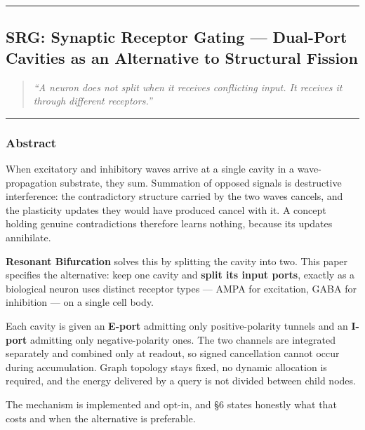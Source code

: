 \documentclass[
  11pt,
  a4paper,
]{article}
\begin{document}
\begin{center}\rule{0.5\linewidth}{0.5pt}\end{center}

\newpage

\subsection{SRG: Synaptic Receptor Gating --- Dual-Port Cavities as an
Alternative to Structural
Fission}\label{srg-synaptic-receptor-gating-dual-port-cavities-as-an-alternative-to-structural-fission}

\begin{quote}
\emph{``A neuron does not split when it receives conflicting input. It
receives it through different receptors.''}
\end{quote}

\begin{center}\rule{0.5\linewidth}{0.5pt}\end{center}

\subsubsection{Abstract}\label{abstract-6}

When excitatory and inhibitory waves arrive at a single cavity in a
wave-propagation substrate, they sum. Summation of opposed signals is
destructive interference: the contradictory structure carried by the two
waves cancels, and the plasticity updates they would have produced
cancel with it. A concept holding genuine contradictions therefore
learns nothing, because its updates annihilate.

\textbf{Resonant Bifurcation} solves this by splitting the cavity into
two. This paper specifies the alternative: keep one cavity and
\textbf{split its input ports}, exactly as a biological neuron uses
distinct receptor types --- AMPA for excitation, GABA for inhibition ---
on a single cell body.

Each cavity is given an \textbf{E-port} admitting only positive-polarity
tunnels and an \textbf{I-port} admitting only negative-polarity ones.
The two channels are integrated separately and combined only at readout,
so signed cancellation cannot occur during accumulation. Graph topology
stays fixed, no dynamic allocation is required, and the energy delivered
by a query is not divided between child nodes.

The mechanism is implemented and opt-in, and §6 states honestly what
that costs and when the alternative is preferable.
\end{document}
